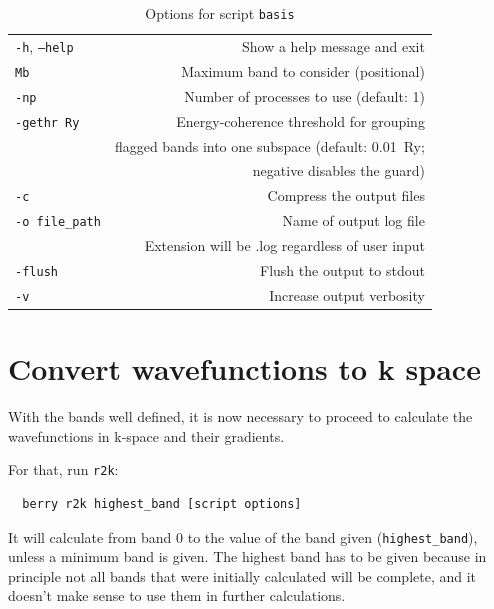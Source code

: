 \documentclass[a4paper,12pt]{report}
\begin{document}
\begin{table}[ht]
 \centering
 \caption{Options for script \texttt{basis}}\label{tab:options_basis}
 \begin{tabular}[]{lr}
 \hline
  \texttt{-h}, \texttt{--help}  &\hspace*{2cm} Show a help message and exit \\
  \texttt{Mb}                   & Maximum band to consider (positional) \\
  \texttt{-np}                  & Number of processes to use (default: 1) \\
  \texttt{-gethr Ry}            & Energy-coherence threshold for grouping\\
                                & flagged bands into one subspace (default: 0.01~Ry;\\
                                & negative disables the guard) \\
  \texttt{-c}                   & Compress the output files \\
  \texttt{-o file\_path}        & Name of output log file\\
                                & Extension will be .log regardless of user input \\
  \texttt{-flush}               & Flush the output to stdout \\
  \texttt{-v}                   & Increase output verbosity \\
  \hline
 \end{tabular}
\end{table}


\section{Convert wavefunctions to k space}

With the bands well defined, it is now necessary to proceed to calculate the wavefunctions in k-space and their gradients.

For that, run \texttt{r2k}:
\begin{verbatim}
  berry r2k highest_band [script options]
 \end{verbatim}

It will calculate from band 0 to the value of the band given (\texttt{highest\_band}),
unless a minimum band is given.
The highest band has to be given because in principle not all bands that were initially calculated will
be complete, and it doesn't make sense to use them in further calculations.
\end{document}
